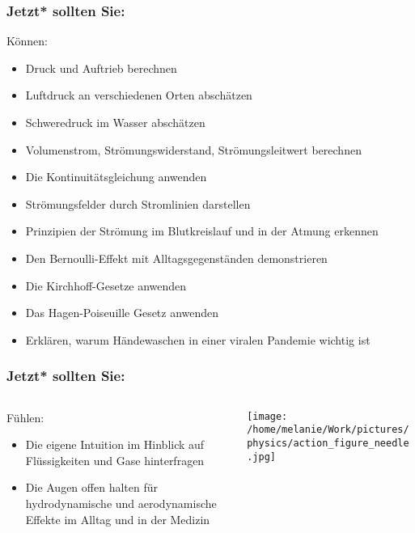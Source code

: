 \documentclass{beamer}
\begin{document}
\begin{frame}

\frametitle{Jetzt* sollten Sie:}
 



\begin{block}{Können:}
\begin{itemize}
\item
Druck und Auftrieb berechnen
\item
Luftdruck an verschiedenen Orten abschätzen
\item
Schweredruck im Wasser abschätzen
\item
Volumenstrom, Strömungswiderstand, Strömungsleitwert berechnen
\item
Die Kontinuitätsgleichung anwenden
\item
Strömungsfelder durch Stromlinien darstellen
\item
Prinzipien der Strömung im Blutkreislauf und in der Atmung erkennen
\item
Den Bernoulli-Effekt mit Alltagsgegenständen demonstrieren
\item
Die Kirchhoff-Gesetze anwenden
\item
Das Hagen-Poiseuille Gesetz anwenden
\item
Erklären, warum Händewaschen in einer viralen Pandemie wichtig ist
\end{itemize}
\end{block}

\end{frame}

\begin{frame}

\frametitle{Jetzt* sollten Sie:}
 

\begin{columns}[c]

\begin{column}{7cm}
\begin{block}{Fühlen:}

\begin{itemize}
\item
Die eigene Intuition im Hinblick auf Flüssigkeiten und Gase hinterfragen
\item
Die Augen offen halten für hydrodynamische und aerodynamische Effekte im Alltag und in der Medizin
\end{itemize}

\end{block}

\end{column}

\begin{column}{4cm}
\begin{center}
\texttt{[image: /home/melanie/Work/pictures/physics/action\_figure\_needle.jpg]}
\end{center}

\end{column}
\end{columns}



 \end{frame}
\end{document}
